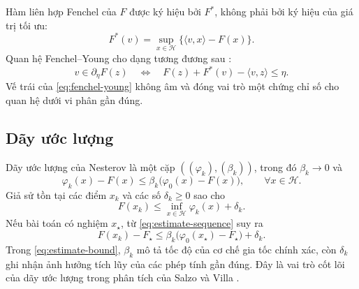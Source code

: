 Hàm liên hợp Fenchel của $F$ được ký hiệu bởi $F^{*}$, không phải bởi ký hiệu của giá trị tối ưu:
\[
F^{*}(v)=\sup_{x\in\mathcal{H}}\{\langle v,x\rangle-F(x)\}.
\]
Quan hệ Fenchel--Young cho dạng tương đương sau \cite{mordukhovich2014}:
\begin{equation}
v\in\partial_{\eta}F(z)
\quad\Longleftrightarrow\quad
F(z)+F^{*}(v)-\langle v,z\rangle\leq\eta.
\label{eq:fenchel-young}
\end{equation}
Vế trái của \eqref{eq:fenchel-young} không âm và đóng vai trò một chứng chỉ số cho quan hệ dưới vi phân gần đúng.

\subsection{Dãy ước lượng}

Dãy ước lượng của Nesterov là một cặp $((\varphi_k),(\beta_k))$, trong đó $\beta_k\to0$ và
\begin{equation}
\varphi_k(x)-F(x)
\leq
\beta_k\bigl(\varphi_0(x)-F(x)\bigr),
\qquad \forall x\in\mathcal{H}.
\label{eq:estimate-sequence}
\end{equation}
Giả sử tồn tại các điểm $x_k$ và các số $\delta_k\geq0$ sao cho
\[
F(x_k)\leq\inf_{x\in\mathcal{H}}\varphi_k(x)+\delta_k.
\]
Nếu bài toán có nghiệm $x_{\star}$, từ \eqref{eq:estimate-sequence} suy ra
\begin{equation}
F(x_k)-F_{\star}
\leq
\beta_k\bigl(\varphi_0(x_{\star})-F_{\star}\bigr)+\delta_k.
\label{eq:estimate-bound}
\end{equation}
Trong \eqref{eq:estimate-bound}, $\beta_k$ mô tả tốc độ của cơ chế gia tốc chính xác, còn $\delta_k$ ghi nhận ảnh hưởng tích lũy của các phép tính gần đúng. Đây là vai trò cốt lõi của dãy ước lượng trong phân tích của Salzo và Villa \cite{nesterov2004,salzo2012}.

